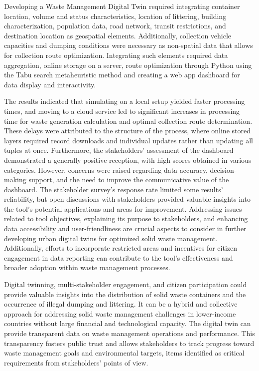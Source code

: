 \documentclass[authoryear,preprint,review,12pt]{elsarticle}
\begin{document}
    Developing a Waste Management Digital Twin required integrating container location, volume and status characteristics, location of littering, building characterization, population data, road network, transit restrictions, and destination location as geospatial elements. Additionally, collection vehicle capacities and dumping conditions were necessary as non-spatial data that allows for collection route optimization. Integrating such elements required data aggregation, online storage on a server, route optimization through Python using the Tabu search metaheuristic method and creating a web app dashboard for data display and interactivity.

    The results indicated that simulating on a local setup yielded faster processing times, and moving to a cloud service led to significant increases in processing time for waste generation calculation and optimal collection route determination. These delays were attributed to the structure of the process, where online stored layers required record downloads and individual updates rather than updating all tuples at once. Furthermore, the stakeholders' assessment of the dashboard demonstrated a generally positive reception, with high scores obtained in various categories. However, concerns were raised regarding data accuracy, decision-making support, and the need to improve the communicative value of the dashboard. The stakeholder survey's response rate limited some results' reliability, but open discussions with stakeholders provided valuable insights into the tool's potential applications and areas for improvement. Addressing issues related to tool objectives, explaining its purpose to stakeholders, and enhancing data accessibility and user-friendliness are crucial aspects to consider in further developing urban digital twins for optimized solid waste management. Additionally, efforts to incorporate restricted areas and incentives for citizen engagement in data reporting can contribute to the tool's effectiveness and broader adoption within waste management processes.

    Digital twinning, multi-stakeholder engagement, and citizen participation could provide valuable insights into the distribution of solid waste containers and the occurrence of illegal dumping and littering. It can be a hybrid and collective approach for addressing solid waste management challenges in lower-income countries without large financial and technological capacity. The digital twin can provide transparent data on waste management operations and performance. This transparency fosters public trust and allows stakeholders to track progress toward waste management goals and environmental targets, items identified as critical requirements from stakeholders’ points of view.
\end{document}
